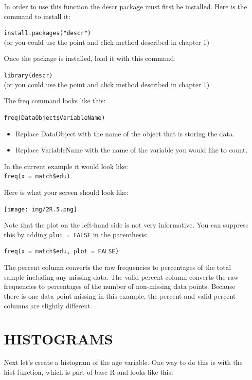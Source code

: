 \documentclass[
]{book}
\providecommand{\tightlist}{%
  \setlength{\itemsep}{0pt}\setlength{\parskip}{0pt}}
\begin{document}
In order to use this function the descr package must first be installed. Here is the command to install it:

\texttt{install.packages("descr")}\\
(or you could use the point and click method described in chapter 1)

Once the package is installed, load it with this command:

\texttt{library(descr)}\\
(or you could use the point and click method described in chapter 1)

The freq command looks like this:

\texttt{freq(DataObject\$VariableName)}

\begin{itemize}
\tightlist
\item
  Replace DataObject with the name of the object that is storing the data.\\
\item
  Replace VariableName with the name of the variable you would like to count.
\end{itemize}

In the current example it would look like:\\
\texttt{freq(x\ =\ match\$edu)}

Here is what your screen should look like:

\texttt{[image: img/2R.5.png]}

Note that the plot on the left-hand side is not very informative. You can suppress this by adding \texttt{plot\ =\ FALSE} in the parenthesis:

\texttt{freq(x\ =\ match\$edu,\ plot\ =\ FALSE)}

The percent column converts the raw frequencies to percentages of the total sample including any missing data. The valid percent column converts the raw frequencies to percentages of the number of non-missing data points. Because there is one data point missing in this example, the percent and valid percent columns are slightly different.

\hypertarget{histograms}{%
\section{HISTOGRAMS}\label{histograms}}

Next let's create a histogram of the age variable. One way to do this is with the hist function, which is part of base R and looks like this:
\end{document}
